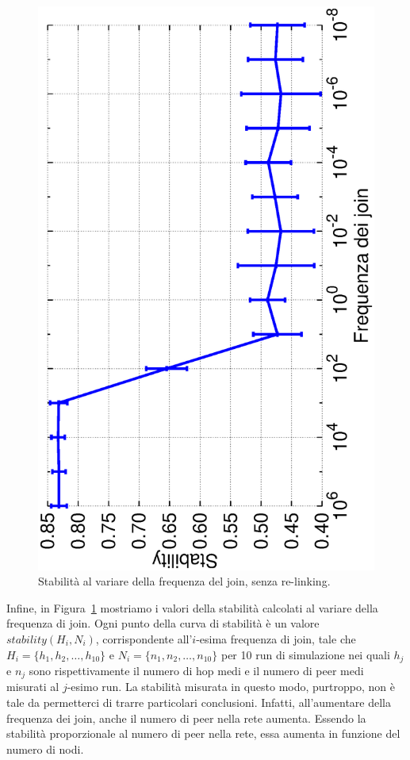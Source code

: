 \documentclass[prodmode,acmtap]{acmlarge}
\begin{document}
\begin{figure}	
\centering
	\includegraphics[scale=.45, angle=-90]{imgs/norelink-freq-stability.eps}
\caption{Stabilità al variare della frequenza del join, senza re-linking.}
\label{img:stabilita2}
\end{figure}

Infine, in Figura~\ref{img:stabilita2} mostriamo i valori della stabilità calcolati al variare della frequenza di join. Ogni punto della curva di stabilità è un valore $stability(H_i,N_i)$, corrispondente all'$i$-esima frequenza di join, tale che $H_i = \{ h_1, h_2, \dots, h_{10} \}$ e $N_i = \{ n_1, n_2, \dots, n_{10} \}$ per 10 run di simulazione nei quali $h_j$ e $n_j$ sono rispettivamente il numero di hop medi e il numero di peer medi misurati al $j$-esimo run. La stabilità misurata in questo modo, purtroppo, non è tale da permetterci di trarre particolari conclusioni. Infatti, all'aumentare della frequenza dei join, anche il numero di peer nella rete aumenta. Essendo la stabilità proporzionale al numero di peer nella rete, essa aumenta in funzione del numero di nodi.
\end{document}
